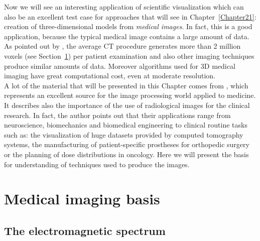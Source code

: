 Now we will see an interesting application of scientific visualization which can also be an excellent test case for approaches that will see in Chapter~\ref{Chapter21}: creation of three-dimensional models from \textit{medical images}.
In fact, this is a good application, because the typical medical image contains a large amount of data. As pointed out by \cite{Stytz}, the average CT procedure generates more than 2 million voxels (see Section~\ref{sec13:medicalImaging}) per patient examination and also other imaging techniques produce similar amounts of data. Moreover algorithms used for 3D medical imaging have great computational cost, even at moderate resolution.\\
\newline
A lot of the material that will be presented in this Chapter comes from \cite{Birkfellner}, which represents an excellent source for the image processing world applied to medicine. It describes also the importance of the use of radiological images for the clinical research. In fact, the author points out that their applications range from neuroscience, biomechanics and biomedical engineering to clinical routine tasks such as: the visualization of huge datasets provided by computed tomography systems, the manufacturing of patient-specific prostheses for orthopedic surgery or the planning of dose distributions in oncology. Here we will present the basis for understanding of techniques used to produce the images.

\section{Medical imaging basis}\label{sec13:medicalImaging}

\subsection{The electromagnetic spectrum}

